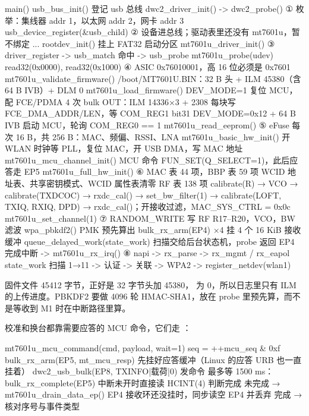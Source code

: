 \begin{txtcode}
main()
  usb_bus_init()                       登记 usb 总线
  dwc2_driver_init() -> dwc2_probe()   ① 枚举：集线器 addr 1，以太网 addr 2，网卡 addr 3
    usb_device_register(&usb_child)    ② 设备进总线；驱动表里还没有 mt7601u，暂不绑定
  ...
  rootdev_init()                       挂上 FAT32 启动分区
  mt7601u_driver_init()                ③ driver_register -> usb_match 命中 -> usb_probe
    mt7601u_probe(udev)
      read32(0x0000), read32(0x1000)   ④ ASIC 0x76010001，高 16 位必须是 0x7601
      mt7601u_validate_firmware()         /boot/MT7601U.BIN：32 B 头 + ILM 45380（含 64 B IVB）+ DLM 0
      mt7601u_load_firmware()             DEV_MODE=1 复位 MCU，配 FCE/PDMA
        4 次 bulk OUT：ILM 14336×3 + 2308   每块写 FCE_DMA_ADDR/LEN，等 COM_REG1 bit31
        DEV_MODE=0x12 + 64 B IVB          启动 MCU，轮询 COM_REG0 == 1
      mt7601u_read_eeprom()            ⑤ eFuse 每次 16 B，共 256 B：MAC、频偏、RSSI、LNA
      mt7601u_basic_hw_init()             开 WLAN 时钟等 PLL，复位 MAC，开 USB DMA，写 MAC 地址
      mt7601u_mcu_channel_init()          MCU 命令 FUN_SET(Q_SELECT=1)，此后应答走 EP5
      mt7601u_full_hw_init()           ⑥ MAC 表 44 项，BBP 表 59 项
                                          WCID 地址表、共享密钥模式、WCID 属性表清零
                                          RF 表 138 项
                                          calibrate(R) → VCO → calibrate(TXDCOC) → rxdc_cal()
                                          → set_bw_filter(1) → calibrate(LOFT, TXIQ, RXIQ, DPD)
                                          → rxdc_cal()；开接收过滤，MAC_SYS_CTRL = 0x0c
      mt7601u_set_channel(1)           ⑦ RANDOM_WRITE 写 RF R17–R20，VCO，BW 滤波
      wpa_pbkdf2()                        PMK 预先算出
      bulk_rx_arm(EP4) ×4                 挂 4 个 16 KiB 接收缓冲
      queue_delayed_work(state_work)      扫描交给后台状态机，probe 返回
EP4 完成中断 -> mt7601u_rx_irq()        ⑧ napi -> rx_parse -> rx_mgmt / rx_eapol
state_work                                扫描 1→11 -> 认证 -> 关联 -> WPA2 -> register_netdev(wlan1)
\end{txtcode}

固件文件 45412 字节，正好是 32 字节头加  45380， 为 0，所以日志里只有 ILM 的上传进度。PBKDF2 要做 4096 轮 HMAC-SHA1，放在 probe 里预先算，而不是等收到 M1 时在中断路径里算。

校准和换台都靠需要应答的 MCU 命令，它们走 ：

\begin{txtcode}
mt7601u_mcu_command(cmd, payload, wait=1)
  seq = ++mcu_seq & 0xf
  bulk_rx_arm(EP5, mt_mcu_resp)          先挂好应答缓冲（Linux 的应答 URB 也一直挂着）
  dwc2_usb_bulk(EP8, TXINFO|载荷|0)       发命令
  最多等 1500 ms：
    bulk_rx_complete(EP5)                中断未开时直接读 HCINT(4) 判断完成
    未完成 → mt7601u_drain_data_ep()      EP4 接收环还没挂时，同步读空 EP4 并丢弃
    完成   → 核对序号与事件类型
\end{txtcode}

